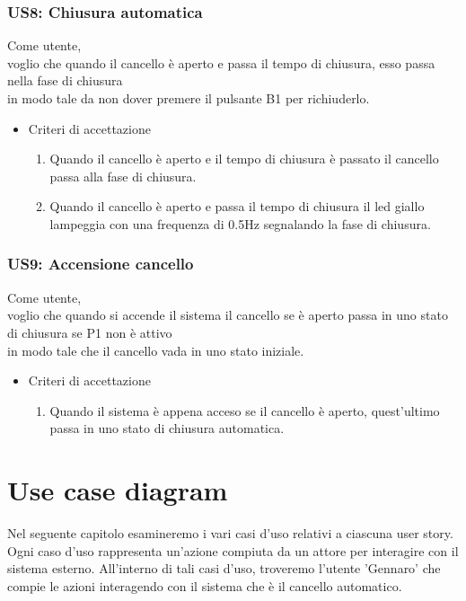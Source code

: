 \documentclass[12pt]{article}
\begin{document}
\subsubsection{US8: Chiusura automatica}
Come utente, \\
voglio che quando il cancello è aperto e passa il tempo di chiusura, esso passa nella fase di chiusura\\
in modo tale da non dover premere il pulsante B1 per richiuderlo.
\begin{itemize}
    \item Criteri di accettazione
    \begin{enumerate}
        \item Quando il cancello è aperto e il tempo di chiusura è passato il cancello passa alla fase di chiusura.
        \item Quando il cancello è aperto e passa il tempo di chiusura il led giallo lampeggia con una frequenza di 0.5Hz segnalando la fase di chiusura.
    \end{enumerate}
\end{itemize}

\subsubsection{US9: Accensione cancello}
Come utente, \\
voglio che quando si accende il sistema il cancello se è aperto passa in uno stato di chiusura se P1 non è attivo\\
in modo tale che il cancello vada in uno stato iniziale.
\begin{itemize}
    \item Criteri di accettazione
    \begin{enumerate}
        \item Quando il sistema è appena acceso se il cancello è aperto, quest'ultimo passa in uno stato di chiusura automatica.
    \end{enumerate}
\end{itemize}


\newpage



\section{Use case diagram}
Nel seguente capitolo esamineremo i vari casi d'uso relativi a ciascuna user story. Ogni caso d'uso rappresenta un'azione compiuta da un attore per interagire con il sistema esterno. All'interno di tali casi d'uso, troveremo l'utente 'Gennaro' che compie le azioni interagendo con il sistema che è il cancello automatico.
\end{document}
